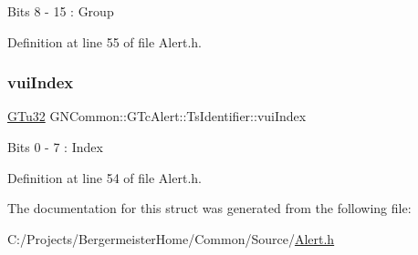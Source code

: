 Bits 8 -\/ 15 \+: Group 

Definition at line 55 of file Alert.\+h.

\mbox{\label{struct_g_n_common_1_1_g_tc_alert_1_1_ts_identifier_a83bb4d784e9f8d772b79a2faab4c279c}} 
\subsubsection{\texorpdfstring{vui\+Index}{vuiIndex}}
{\footnotesize\ttfamily \mbox{\hyperlink{namespace_g_n_common_ae5485474bc8f23e462e920a17b377b53}{G\+Tu32}} G\+N\+Common\+::\+G\+Tc\+Alert\+::\+Ts\+Identifier\+::vui\+Index}

Bits 0 -\/ 7 \+: Index 

Definition at line 54 of file Alert.\+h.



The documentation for this struct was generated from the following file\+:\begin{DoxyCompactItemize}
\item 
C\+:/\+Projects/\+Bergermeister\+Home/\+Common/\+Source/\mbox{\hyperlink{_alert_8h}{Alert.\+h}}\end{DoxyCompactItemize}

